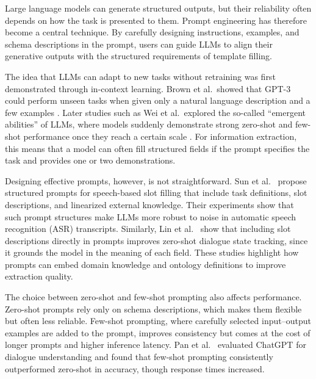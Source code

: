 Large language models can generate structured outputs, but their reliability often depends on how the task is presented to them. Prompt engineering has therefore become a central technique. By carefully designing instructions, examples, and schema descriptions in the prompt, users can guide LLMs to align their generative outputs with the structured requirements of template filling.

The idea that LLMs can adapt to new tasks without retraining was first demonstrated through in-context learning. Brown et al.\ showed that GPT-3 could perform unseen tasks when given only a natural language description and a few examples \cite{brown2020language}. Later studies such as Wei et al.\ explored the so-called “emergent abilities” of LLMs, where models suddenly demonstrate strong zero-shot and few-shot performance once they reach a certain scale \cite{wei2022emergent}. For information extraction, this means that a model can often fill structured fields if the prompt specifies the task and provides one or two demonstrations.

Designing effective prompts, however, is not straightforward. Sun et al.\ \cite{sun2023slot} propose structured prompts for speech-based slot filling that include task definitions, slot descriptions, and linearized external knowledge. Their experiments show that such prompt structures make LLMs more robust to noise in automatic speech recognition (ASR) transcripts. Similarly, Lin et al.\ \cite{lin2021leveraging} show that including slot descriptions directly in prompts improves zero-shot dialogue state tracking, since it grounds the model in the meaning of each field. These studies highlight how prompts can embed domain knowledge and ontology definitions to improve extraction quality.

The choice between zero-shot and few-shot prompting also affects performance. Zero-shot prompts rely only on schema descriptions, which makes them flexible but often less reliable. Few-shot prompting, where carefully selected input–output examples are added to the prompt, improves consistency but comes at the cost of longer prompts and higher inference latency. Pan et al.\ \cite{pan2023chatgpt} evaluated ChatGPT for dialogue understanding and found that few-shot prompting consistently outperformed zero-shot in accuracy, though response times increased.

